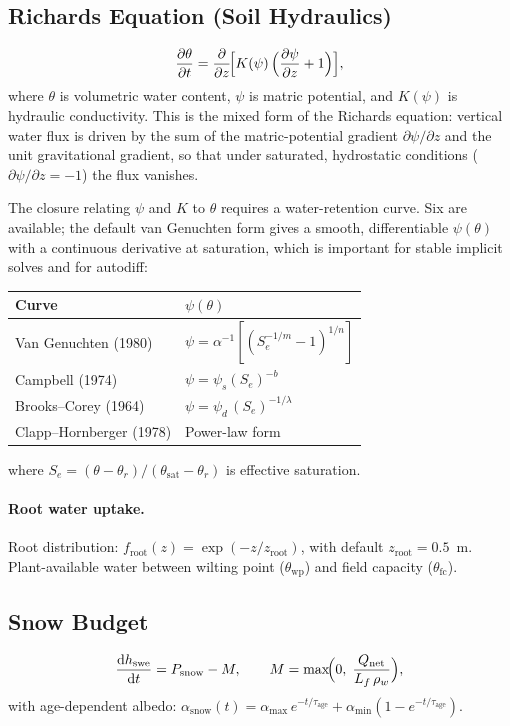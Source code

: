 \documentclass[11pt,twoside]{report}
\newcommand{\dd}{\mathrm{d}}
\newcommand{\pp}{\partial}
\newcommand{\Lf}{L_f}
\begin{document}
\subsection{Richards Equation (Soil Hydraulics)}
\begin{equation}
  \frac{\pp\theta}{\pp t} = \frac{\pp}{\pp z}
  \!\Bigl[K(\psi)\,\Bigl(\frac{\pp\psi}{\pp z}+1\Bigr)\Bigr],
\end{equation}
where $\theta$ is volumetric water content, $\psi$ is matric potential,
and $K(\psi)$ is hydraulic conductivity.  This is the mixed form of the Richards
equation: vertical water flux is driven by the sum of the matric-potential
gradient $\pp\psi/\pp z$ and the unit gravitational gradient, so that under
saturated, hydrostatic conditions ($\pp\psi/\pp z=-1$) the flux vanishes.

The closure relating $\psi$ and $K$ to $\theta$ requires a water-retention
curve.  Six are available; the default van Genuchten form \citep{VanGenuchten1980}
gives a smooth, differentiable $\psi(\theta)$ with a continuous derivative at
saturation, which is important for stable implicit solves and for autodiff:
\begin{center}
\begin{tabular}{ll}
\toprule
Curve & $\psi(\theta)$ \\
\midrule
Van Genuchten (1980) & $\psi = \alpha^{-1}[(S_e^{-1/m}-1)^{1/n}]$ \\
Campbell (1974) & $\psi = \psi_s(S_e)^{-b}$ \\
Brooks--Corey (1964) & $\psi = \psi_d\,(S_e)^{-1/\lambda}$ \\
Clapp--Hornberger (1978) & Power-law form \\
\bottomrule
\end{tabular}
\end{center}
where $S_e = (\theta-\theta_r)/(\theta_{\mathrm{sat}}-\theta_r)$ is
effective saturation.

\paragraph{Root water uptake.}
Root distribution: $f_{\mathrm{root}}(z)=\exp(-z/z_{\mathrm{root}})$,
with default $z_{\mathrm{root}}=0.5$~m.
Plant-available water between wilting point ($\theta_{\mathrm{wp}}$)
and field capacity ($\theta_{\mathrm{fc}}$).

\subsection{Snow Budget}
\begin{equation}
  \frac{\dd h_{\mathrm{swe}}}{\dd t} = P_{\mathrm{snow}} - M,
  \qquad M = \max\!\Bigl(0,\;\frac{Q_{\mathrm{net}}}{\Lf\,\rho_w}\Bigr),
\end{equation}
with age-dependent albedo: $\alpha_{\mathrm{snow}}(t)=\alpha_{\max}\,e^{-t/\tau_{\mathrm{age}}}
+ \alpha_{\min}(1-e^{-t/\tau_{\mathrm{age}}})$.
\end{document}
